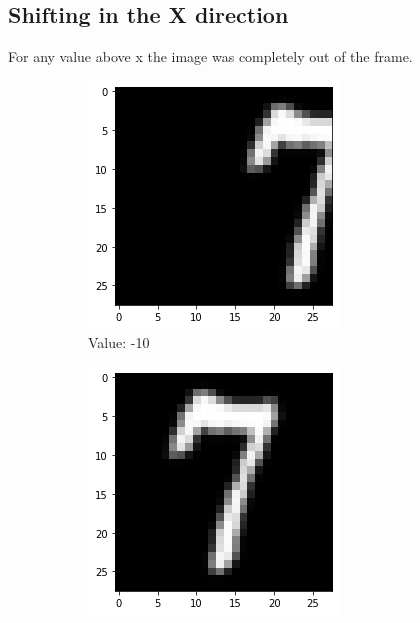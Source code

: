 \subsection{Shifting in the X direction}
    For any value above x the image was completely out of the frame.
    \begin{figure}[htb!]
        \centering
        \begin{subfigure}[b]{.3\textwidth}
            \centering
            \includegraphics[width=\linewidth]{images/shiftx1.png}
            \caption{Value: -10}
            \label{fig:Rotate-misclass0}
        \end{subfigure}%
        \begin{subfigure}[b]{.3\textwidth}
            \centering
            \includegraphics[width=\textwidth]{images/shiftx2.png}

\end{subfigure}
\end{figure}
